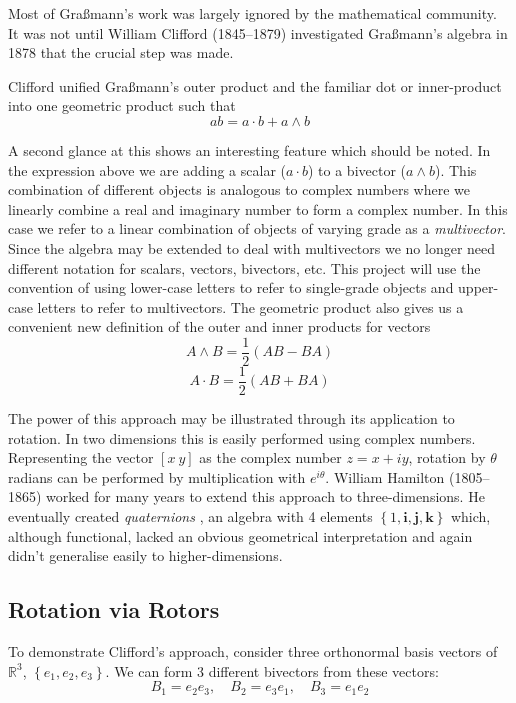 Most of Gra{\ss}mann's work was largely ignored by the mathematical community.
It was not until William Clifford (1845--1879) investigated Gra{\ss}mann's
algebra in 1878 \cite{GA:clifford} that the crucial step was made.

Clifford unified Gra{\ss}mann's outer product and the familiar dot
or inner-product into one geometric product such that
\begin{displaymath}
ab = a\cdot b + a \wedge b
\end{displaymath}

A second glance at this shows an interesting feature which should be noted.
In the expression above we are adding a scalar ($a \cdot b$) to a 
bivector ($a \wedge b$). This combination of different objects is
analogous to complex numbers where we linearly combine
a real and imaginary number to form a complex number. In this case we
refer to a linear combination of objects of varying grade as a
\emph{multivector}. Since the algebra may be extended to deal with
multivectors we no longer need different notation for scalars, vectors,
bivectors, etc. This project will use the convention of using lower-case
letters to refer to single-grade objects and upper-case letters to refer
to multivectors. The geometric product also gives us a convenient new
definition of the outer and inner products for vectors
\[
A \wedge B = \frac{1}{2}(AB - BA)
\]
\[
A \cdot B = \frac{1}{2}(AB + BA)
\]

The power of this approach may be illustrated through its application
to rotation. In two dimensions this is easily performed using complex numbers. Representing
the vector $[x\ y]$ as the complex number $z = x + iy$, rotation by
$\theta$ radians can be performed by multiplication with $e^{i\theta}$.
William Hamilton (1805--1865) worked for many years to extend this approach
to three-dimensions. He eventually created \emph{quaternions} \cite{hamilton2,hamilton1},
an algebra with 4 
elements $\left\{1, \mathbf{i}, \mathbf{j}, \mathbf{k}\right\}$ which, although
functional, lacked an obvious geometrical interpretation and again didn't
generalise easily to higher-dimensions.

\subsection{Rotation via Rotors}

To demonstrate Clifford's approach, consider three orthonormal basis
vectors of $\mathbb{R}^3$, $\left\{e_1, e_2, e_3\right\}$. We can form
3 different bivectors from these vectors:
\begin{displaymath}
B_1 = e_2e_3,\quad B_2 = e_3e_1,\quad B_3 = e_1e_2
\end{displaymath}

